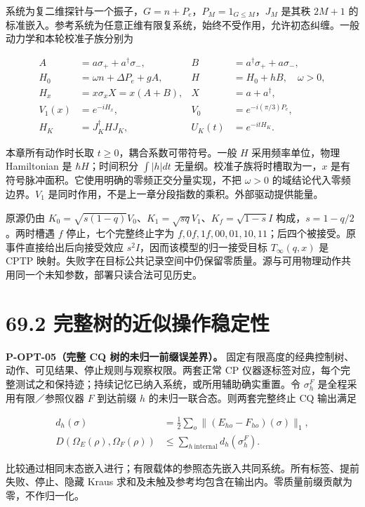 \documentclass[
  11pt,
  oneside]{book}
\begin{document}
系统为复二维探针与一个振子，\(G=n+P_e\)，\(P_M=1_{G\le M}\)，\(J_M\)
是其秩 \(2M+1\)
的标准嵌入。参考系统为任意正维有限复系统，始终不受作用，允许初态纠缠。一般动力学和本轮校准子族分别为

\[
\begin{aligned}
A&=a\sigma_++a^\dagger\sigma_-,&B&=a^\dagger\sigma_++a\sigma_-,\\
H_0&=\omega n+\Delta P_e+gA,&H&=H_0+hB,\quad\omega>0,\\
H_x&=x\sigma_xX=x(A+B),&X&=a+a^\dagger,\\
V_1(x)&=e^{-iH_x},&V_0&=e^{-i(\pi/3)P_e},\\
H_K&=J_K^\dagger HJ_K,&U_K(t)&=e^{-itH_K}.
\end{aligned}
\]

本章所有动作时长取 \(t\ge0\)，耦合系数可带符号。一般 \(H\)
采用频率单位，物理 Hamiltonian 是 \(\hbar H\)；时间积分 \(\int|h|dt\)
无量纲。校准子族将时槽取为一，\(x\)
是有符号脉冲面积。它使用明确的零频正交分量实现，不把 \(\omega>0\)
的域结论代入零频边界。\(V_1\)
是同时作用，不是上一章分段指数的乘积。外部驱动提供能量。

原源仍由
\(K_0=\sqrt{s(1-q)}V_0\)、\(K_1=\sqrt{sq}V_1\)、\(K_f=\sqrt{1-s}I\)
构成，\(s=1-q/2\)。两时槽遇 \(f\) 停止，七个完整终止字为
\(f,0f,1f,00,01,10,11\)；后四个被接受。原事件直接给出后向接受效应
\(s^2I\)，因而该模型的归一接受目标 \(T_\infty(q,x)\) 是 CPTP
映射。失败字在目标公共记录空间中仍保留零质量。源与可用物理动作共用同一个未知参数，部署只读合法可见历史。

\section{69.2 完整树的近似操作稳定性}

\protect\hypertarget{p-opt-05}{}{}

\textbf{P-OPT-05（完整 CQ 树的未归一前缀误差界）。}
固定有限高度的经典控制树、动作、可见结果、停止规则与观察权限。两套正常
CP
仪器逐标签对应，每个完整测试之和保持迹；持续记忆已纳入系统，或所用辅助确实重置。令
\(\sigma_h^F\) 是全程采用有限／参照仪器 \(F\) 到达前缀 \(h\)
的未归一联合态。则两套完整终止 CQ 输出满足

\[
\begin{aligned}
d_h(\sigma)&=\frac12\sum_o\|(E_{ho}-F_{ho})(\sigma)\|_1,\\
D(\Omega_E(\rho),\Omega_F(\rho))
&\le\sum_{h\ \mathrm{internal}}d_h(\sigma_h^F).
\end{aligned}
\]

比较通过相同末态嵌入进行；有限载体的参照态先嵌入共同系统。所有标签、提前失败、停止、隐藏
Kraus 求和及未触及参考均包含在输出内。零质量前缀贡献为零，不作归一化。
\end{document}
